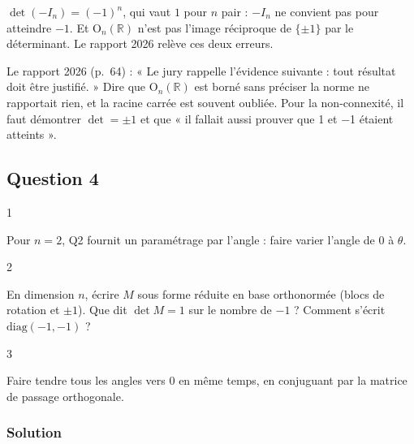 \documentclass[11pt,a4paper]{article}
\begin{document}
\begin{piege}

\(\det(-I_n)=(-1)^n\), qui vaut \(1\) pour \(n\) pair : \(-I_n\) ne convient pas pour atteindre \(-1\).
Et \({\mathrm{O}}_n(\mathbb R)\) n'est pas l'image réciproque de \(\{\pm1\}\) par le déterminant. Le rapport 2026 relève ces deux erreurs.

\end{piege}

\begin{jury}

Le rapport 2026 (p.~64) : « Le jury rappelle l'évidence suivante : tout résultat doit être justifié. » Dire que \({\mathrm{O}}_n(\mathbb R)\) est borné sans préciser la norme ne rapportait rien, et la racine carrée est souvent oubliée. Pour la non-connexité, il faut démontrer \(\det=\pm1\) et que « il fallait aussi prouver que 1 et −1 étaient atteints ».

\end{jury}

\hypertarget{question-4}{%
\subsection{Question 4}\label{question-4}}

\begin{indication}{1}

Pour \(n=2\), Q2 fournit un paramétrage par l'angle : faire varier l'angle de \(0\) à \(\theta\).

\end{indication}

\begin{indication}{2}

En dimension \(n\), écrire \(M\) sous forme réduite en base orthonormée (blocs de rotation et \(\pm1\)). Que dit \(\det M=1\) sur le nombre de \(-1\) ? Comment s'écrit \(\mathrm{diag}(-1,-1)\) ?

\end{indication}

\begin{indication}{3}

Faire tendre tous les angles vers \(0\) en même temps, en conjuguant par la matrice de passage orthogonale.

\end{indication}

\hypertarget{solution-3}{%
\subsubsection{Solution}\label{solution-3}}
\end{document}
